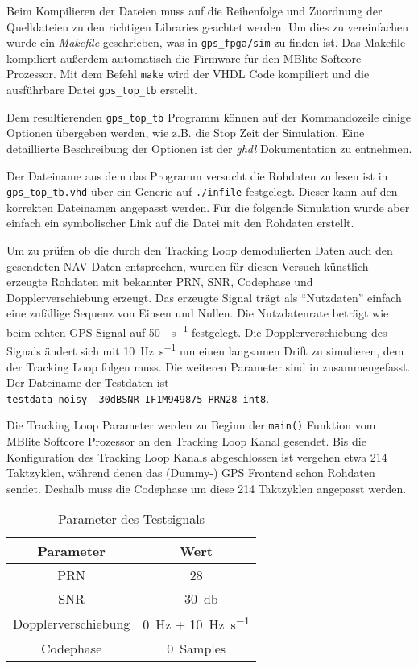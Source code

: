 Beim Kompilieren der Dateien muss auf die Reihenfolge und Zuordnung der Quelldateien zu den richtigen Libraries geachtet werden. Um dies zu vereinfachen wurde ein \emph{Makefile} geschrieben, was in \lstinline$gps_fpga/sim$ zu finden ist. Das Makefile kompiliert außerdem automatisch die Firmware für den MBlite Softcore Prozessor. Mit dem Befehl \lstinline$make$ wird der VHDL Code kompiliert und die ausführbare Datei \lstinline$gps_top_tb$ erstellt.

Dem resultierenden \lstinline$gps_top_tb$ Programm können auf der Kommandozeile einige Optionen übergeben werden, wie z.B. die Stop Zeit der Simulation. Eine detaillierte Beschreibung der Optionen ist der \emph{ghdl} Dokumentation zu entnehmen.

Der Dateiname aus dem das Programm versucht die Rohdaten zu lesen ist in \lstinline$gps_top_tb.vhd$ über ein Generic auf \lstinline$./infile$ festgelegt. Dieser kann auf den korrekten Dateinamen angepasst werden. Für die folgende Simulation wurde aber einfach ein symbolischer Link auf die Datei mit den Rohdaten erstellt.

Um zu prüfen ob die durch den Tracking Loop demodulierten Daten auch den gesendeten NAV Daten entsprechen, wurden für diesen Versuch künstlich erzeugte Rohdaten mit bekannter PRN, SNR, Codephase und Dopplerverschiebung erzeugt. Das erzeugte Signal trägt als \enquote{Nutzdaten} einfach eine zufällige Sequenz von Einsen und Nullen. Die Nutzdatenrate beträgt wie beim echten GPS Signal auf \SI{50}{\bit\per\second} festgelegt. Die Dopplerverschiebung des Signals ändert sich mit \SI{10}{\hertz\per\second} um einen langsamen Drift zu simulieren, dem der Tracking Loop folgen muss. Die weiteren Parameter sind in  zusammengefasst. Der Dateiname der Testdaten ist \lstinline$testdata_noisy_-30dBSNR_IF1M949875_PRN28_int8$.

Die Tracking Loop Parameter werden zu Beginn der \lstinline$main()$ Funktion vom MBlite Softcore Prozessor an den Tracking Loop Kanal gesendet. Bis die Konfiguration des Tracking Loop Kanals abgeschlossen ist vergehen etwa 214 Taktzyklen, während denen das (Dummy-) GPS Frontend schon Rohdaten sendet. Deshalb muss die Codephase um diese 214 Taktzyklen angepasst werden.

\begin{table}[htbp]
    \ttabbox
    {
        \caption[Testsignal Parameter]{Parameter des Testsignals}
        \label{TrackingVersuchTestsignalParameter}
    }
    {
    \begin{tabular}{c c}
        \toprule
        Parameter               & Wert \\
        \midrule
        PRN	                    & \num{28} \\
        SNR               & \SI{-30}{\decibel} \\
        Dopplerverschiebung     & \SI{0}{\hertz} + \SI{10}{\hertz\per\second}\\
        Codephase               & \SI{0}{Samples} \\
        \bottomrule
    \end{tabular}
}
\end{table}


